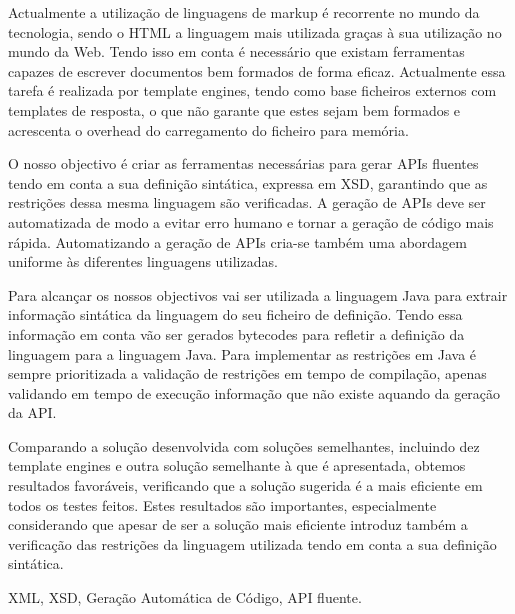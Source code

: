 \abstractPT  %

Actualmente a utilização de linguagens de markup é recorrente no mundo da tecnologia, sendo o \ac{HTML} a linguagem mais utilizada graças à sua utilização no mundo da Web. Tendo isso em conta é necessário que existam ferramentas capazes de escrever documentos bem formados de forma eficaz. Actualmente essa tarefa é realizada por template engines, tendo como base ficheiros externos com templates de resposta, o que não garante que estes sejam bem formados e acrescenta o overhead do carregamento do ficheiro para memória.

\noindent
O nosso objectivo é criar as ferramentas necessárias para gerar \ac{API}s fluentes tendo em conta a sua definição sintática, expressa em \ac{XSD}, garantindo que as restrições dessa mesma linguagem são verificadas. A geração de \ac{API}s deve ser automatizada de modo a evitar erro humano e tornar a geração de código mais rápida. Automatizando a geração de \ac{API}s cria-se também uma abordagem uniforme às diferentes linguagens utilizadas.

\noindent
Para alcançar os nossos objectivos vai ser utilizada a linguagem Java para extrair informação sintática da linguagem do seu ficheiro de definição. Tendo essa informação em conta vão ser gerados bytecodes para refletir a definição da linguagem para a linguagem Java. Para implementar as restrições em Java é sempre prioritizada a validação de restrições em tempo de compilação, apenas validando em tempo de execução informação que não existe aquando da geração da \ac{API}.

\noindent
Comparando a solução desenvolvida com soluções semelhantes, incluindo dez template engines e outra solução semelhante à que é apresentada, obtemos resultados favoráveis, verificando que a solução sugerida é a mais eficiente em todos os testes feitos. Estes resultados são importantes, especialmente considerando que apesar de ser a solução mais eficiente introduz também a verificação das restrições da linguagem utilizada tendo em conta a sua definição sintática.

\begin{keywords}
XML, XSD, Geração Automática de Código, API fluente.
\end{keywords}
